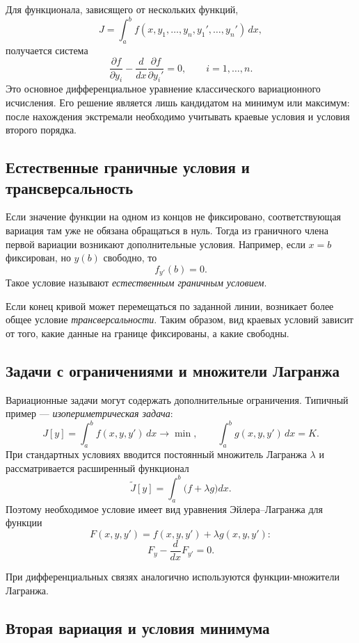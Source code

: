Для функционала, зависящего от нескольких функций,
\[
    J=\int_a^b
    f(x,y_1,\ldots,y_n,y_1',\ldots,y_n')\,dx,
\]
получается система
\[
    \frac{\partial f}{\partial y_i}
    -\frac{d}{dx}\frac{\partial f}{\partial y_i'}=0,
    \qquad i=1,\ldots,n.
\]
Это основное дифференциальное уравнение классического вариационного исчисления.
Его решение является лишь кандидатом на минимум или максимум: после нахождения
экстремали необходимо учитывать краевые условия и условия второго порядка.


\subsection{Естественные граничные условия и трансверсальность}

Если значение функции на одном из концов не фиксировано, соответствующая
вариация там уже не обязана обращаться в нуль. Тогда из граничного члена первой
вариации возникают дополнительные условия. Например, если $x=b$ фиксирован,
но $y(b)$ свободно, то
\[
    f_{y'}(b)=0.
\]
Такое условие называют \emph{естественным граничным условием}.

Если конец кривой может перемещаться по заданной линии, возникает более общее
условие \emph{трансверсальности}. Таким образом, вид краевых условий зависит от
того, какие данные на границе фиксированы, а какие свободны.

\subsection{Задачи с ограничениями и множители Лагранжа}

Вариационные задачи могут содержать дополнительные ограничения. Типичный пример
--- \emph{изопериметрическая задача}:
\[
    J[y]=\int_a^b f(x,y,y')\,dx\to\min,
    \qquad
    \int_a^b g(x,y,y')\,dx=K.
\]
При стандартных условиях вводится постоянный множитель Лагранжа $\lambda$ и
рассматривается расширенный функционал
\[
    \widetilde J[y]
    =\int_a^b\bigl(f+\lambda g\bigr)dx.
\]
Поэтому необходимое условие имеет вид уравнения Эйлера--Лагранжа для функции
\[
    F(x,y,y')=f(x,y,y')+\lambda g(x,y,y'):
\]
\[
    F_y-\frac{d}{dx}F_{y'}=0.
\]

При дифференциальных связях аналогично используются функции-множители
Лагранжа.

\subsection{Вторая вариация и условия минимума}

